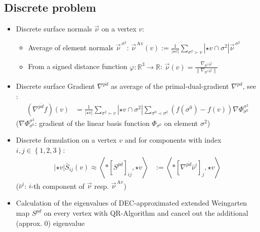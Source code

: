 \documentclass{scrartcl}
\newcommand{\R}{\mathds{R}}
\newcommand{\vecover}[2]{\vec{#1}^{\,#2}}
\newcommand{\av}{\text{Av}}
\begin{document}
\subsection*{Discrete problem}
\begin{itemize}
  \item Discrete surface normals \( \vec{\nu} \) on a vertex \( v \):
    \begin{itemize}
      \item Average of element normals \( \vecover{\nu}{\sigma^{2}} \): \hfill
        \( \vecover{\nu}{\av}(v) := \frac{1}{\left| \star v \right|} \sum_{\sigma^{2}\succ v} \left| \star v \cap \sigma^{2}\right| 
                                          \vecover{\nu}{\sigma^{2}} \)
      \item From a signed distance function \( \varphi:\R^{3} \rightarrow \R \): \hfill
      \(\vec{\nu}(v) = \frac{ \nabla_{\R^{3}}\varphi}{\left\| \nabla_{\R^{3}}\varphi \right\|}  \)
    \end{itemize}
 \item Discrete surface Gradient \( \nabla^{\overline{pd}} \) as average of the primal-dual-gradient \( \nabla^{pd} \), see \cite{hirani}:
 \begin{align*}
   \left( \nabla^{\overline{pd}} f\right)(v) 
        &= \frac{1}{\left| \star v \right|} \sum_{\sigma^{2}\succ v} \left| \star v \cap \sigma^{2} \right|
                 \sum_{\sigma^{0}\prec\sigma^{2}} \left( f(\sigma^{0}) - f(v) \right) \nabla\Phi_{\sigma^{0}}^{\sigma^{2}}
 \end{align*}
 (\(\nabla\Phi_{\sigma^{0}}^{\sigma^{2}}\): gradient of the linear basis function \( \Phi_{\sigma^{0}} \) on element \( \sigma^{2} \))

 \item Discrete formulation on a vertex \( v \) and for components with index \( i,j\in\left\{ 1,2,3 \right\} \):
 \begin{align*}
    \left| \star v \right| \bar{S}_{ij}(v) \approx 
           \left\langle *\left[ S^{\overline{pd}} \right]_{ij} , \star v \right\rangle 
    &:= \left\langle *\left[ \nabla^{\overline{pd}}\bar{\nu}^{i} \right]_{j} , \star v \right\rangle
 \end{align*}
 (\( \bar{\nu}^{i} \): \( i \)-th component of \(\vec{\nu} \) resp. \( \vecover{\nu}{\av} \))
 \item Calculation of the eigenvalues of DEC-approximated extended Weingarten map \( S^{\overline{pd}} \) on every vertex with QR-Algorithm and cancel out the additional (approx. 0) eigenvalue
\end{itemize}

\pagebreak

{}
\end{document}
